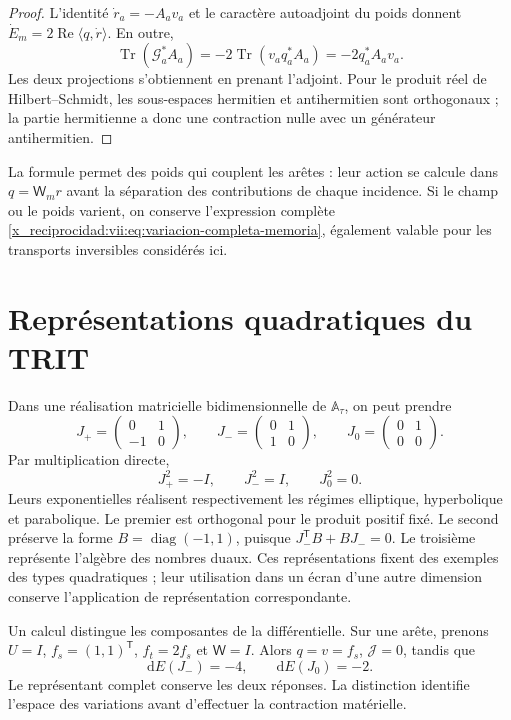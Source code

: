 \begin{proof}
L'identité \(\dot r_a=-A_av_a\) et le caractère autoadjoint du poids donnent \(\dot E_m=2\operatorname{Re}\langle q,\dot r\rangle\). En outre,
\[
 \operatorname{Tr}(\mathcal G_a^*A_a)
 =-2\operatorname{Tr}(v_aq_a^*A_a)=-2q_a^*A_av_a.
\]
Les deux projections s'obtiennent en prenant l'adjoint. Pour le produit
réel de Hilbert--Schmidt, les sous-espaces hermitien et antihermitien sont
orthogonaux ; la partie hermitienne a donc une contraction nulle avec
un générateur antihermitien.
\end{proof}

La formule permet des poids qui couplent les arêtes : leur action se calcule dans
\(q=\mathsf W_mr\) avant la séparation des contributions de chaque
incidence. Si le champ ou le poids varient, on conserve l'expression complète
\eqref{x_reciprocidad:vii:eq:variacion-completa-memoria}, également valable pour les
transports inversibles considérés ici.

\section{Représentations quadratiques du TRIT}

Dans une réalisation matricielle bidimensionnelle de \(\mathbb A_\tau\), on peut prendre
\[
 J_{+}=\begin{pmatrix}0&1\\-1&0\end{pmatrix},\qquad
 J_{-}=\begin{pmatrix}0&1\\1&0\end{pmatrix},\qquad
 J_{0}=\begin{pmatrix}0&1\\0&0\end{pmatrix}.
\]
Par multiplication directe,
\[
 J_+^2=-I,\qquad J_-^2=I,\qquad J_0^2=0.
\]
Leurs exponentielles réalisent respectivement les régimes elliptique, hyperbolique et parabolique. Le premier est orthogonal pour le produit positif fixé. Le second préserve la forme \(B=\operatorname{diag}(-1,1)\), puisque \(J_-^{\mathsf T}B+BJ_-=0\). Le troisième représente l'algèbre des nombres duaux. Ces représentations fixent des exemples des types quadratiques ; leur utilisation dans un écran d'une autre dimension conserve l'application de représentation correspondante.

Un calcul distingue les composantes de la différentielle. Sur une arête,
prenons \(U=I\), \(f_s=(1,1)^{\mathsf T}\),
\(f_t=2f_s\) et \(\mathsf W=I\). Alors \(q=v=f_s\),
\(\mathcal J=0\), tandis que
\begin{equation}
 \mathrm dE(J_-)=-4,\qquad \mathrm dE(J_0)=-2.
 \label{x_reciprocidad:vii:eq:control-regimenes-corriente}
\end{equation}
Le représentant complet conserve les deux réponses. La distinction
identifie l'espace des variations avant d'effectuer la contraction
matérielle.

